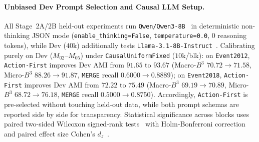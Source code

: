 \begin{table}[t]
\centering
\caption{Chronological dataset partitions across warmup, development, and $27$ unseen held-out blocks ($65{,}856$ evaluated posts).}
\label{tab:datasets}
\end{table}

\paragraph{Unbiased Dev Prompt Selection and Causal LLM Setup.}
All Stage~2A/2B held-out experiments run \texttt{Qwen/Qwen3-8B}~\citep{yang2025qwen3} in deterministic non-thinking JSON mode (\texttt{enable\_thinking=False}, \texttt{temperature=0.0}, $0$ reasoning tokens), while Dev ($40\text{k}$) additionally tests \texttt{Llama-3.1-8B-Instruct}~\citep{grattafiori2024llama3}. Calibrating purely on Dev ($M_{02}$--$M_{05}$) under \texttt{CausalUniformFixed} ($10\text{k}$/blk): on \texttt{Event2012}, \texttt{Action-First} improves Dev AMI from $91.65$ to \textbf{$93.67$} (Macro-$B^3$ $70.72 \to 71.58$, Micro-$B^3$ $88.26 \to 91.87$, \texttt{MERGE} recall $0.6000 \to 0.8889$); on \texttt{Event2018}, \texttt{Action-First} improves Dev AMI from $72.22$ to \textbf{$75.49$} (Macro-$B^3$ $69.19 \to 70.89$, Micro-$B^3$ $68.72 \to 76.18$, \texttt{MERGE} recall $0.5000 \to 0.8750$). Accordingly, \texttt{Action-First} is pre-selected without touching held-out data, while both prompt schemas are reported side by side for transparency. Statistical significance across blocks uses paired two-sided Wilcoxon signed-rank tests~\citep{wilcoxon1945individual} with Holm-Bonferroni correction~\citep{holm1979simple} and paired effect size Cohen's $d_z$~\citep{cohen1988statistical}.

